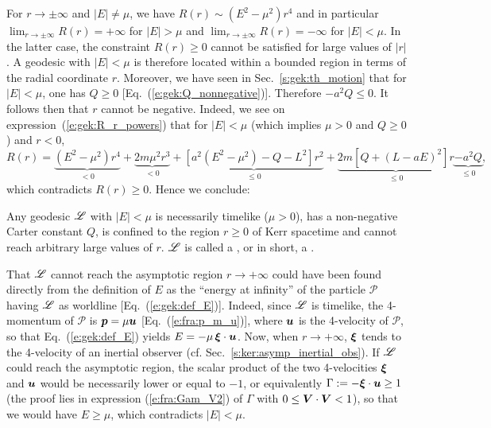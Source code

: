 For $r\to \pm\infty$ and $|E|\neq \mu$,
we have $R(r) \sim (E^2 - \mu^2) r^4$ and in
particular $\lim_{r\to\pm\infty} R(r) = + \infty$ for $|E|>\mu$
and $\lim_{r\to\pm\infty} R(r) = - \infty$ for $|E|<\mu$. In the latter case,
the constraint $R(r) \geq 0$ cannot be satisfied for large values
of $|r|$. A geodesic with $|E|<\mu$ is therefore located within a bounded
region in terms of the radial coordinate $r$. Moreover, we have seen in
Sec.~\ref{s:gek:th_motion} that for $|E|<\mu$, one has $Q\geq 0$
[Eq.~(\ref{e:gek:Q_nonnegative})]. Therefore $-a^2 Q \leq 0$.
It follows then that $r$ cannot be negative.
Indeed, we see
on expression~(\ref{e:gek:R_r_powers}) that for $|E|<\mu$ (which implies $\mu>0$ and $Q\geq 0$) and $r<0$,
\[
    R(r) = \underbrace{(E^2 - \mu^2) r^4}_{<0} + \underbrace{2 m \mu^2 r^3}_{<0}
     + \underbrace{\left[ a^2 (E^2 - \mu^2) - Q - L^2 \right] r^2}_{\leq 0}
     + \underbrace{2m\left[ Q + (L - a E)^2 \right] r}_{\leq 0}
     \underbrace{-a^2 Q}_{\leq 0} ,
\]
which contradicts $R(r)\geq 0$.
Hence we conclude:
\begin{greybox}
Any geodesic $\mathscr{L}$ with $|E|<\mu$ is necessarily timelike ($\mu >0$),
has a non-negative Carter constant $Q$,
is confined to the region $r\geq 0$ of Kerr spacetime
and cannot reach arbitrary large values of $r$. $\mathscr{L}$ is called a
,
or in short, a .
\end{greybox}
\begin{remark} \label{r:gek:bound_geod}
That $\mathscr{L}$
cannot reach the asymptotic region $r\to +\infty$ could have been
found directly from the definition of $E$ as the ``energy at infinity''
of the particle $\mathscr{P}$ having $\mathscr{L}$ as worldline
[Eq.~(\ref{e:gek:def_E})]. Indeed, since $\mathscr{L}$ is timelike, the 4-momentum
of $\mathscr{P}$ is $\bm{p} = \mu \bm{u}$ [Eq.~(\ref{e:fra:p_m_u})], where
$\bm{u}$ is the 4-velocity of $\mathscr{P}$, so that Eq.~(\ref{e:gek:def_E})
yields $E = - \mu\, \bm{\xi}\cdot\bm{u}$. Now, when $r\to +\infty$, $\bm{\xi}$
tends to the 4-velocity of an inertial observer (cf. Sec.~\ref{s:ker:asymp_inertial_obs}).
If $\mathscr{L}$ could reach the asymptotic region,
the scalar
product of the two 4-velocities $\bm{\xi}$ and
$\bm{u}$ would be necessarily lower or equal to $-1$, or equivalently
$\Gamma := - \bm{\xi}\cdot\bm{u} \geq 1$ (the proof lies in expression
(\ref{e:fra:Gam_V2}) of $\Gamma$ with $0\leq \bm{V}\cdot\bm{V} < 1$), so that
we would have $E \geq \mu$, which contradicts $|E|<\mu$.
\end{remark}

